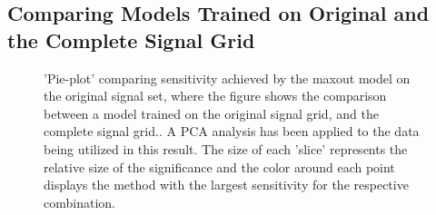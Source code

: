 \subsection{Comparing Models Trained on Original and the Complete Signal Grid}\label{appendix:BigVsSmall}
\begin{figure}[H]
    \caption['Pie-plot' comparing sensitivity achieved by the maxout model on the original signal set, where the figure shows the comparison between a model trained 
    on the original signal grid, and the complete signal grid.]{'Pie-plot' comparing sensitivity achieved by the maxout model on the original signal set, where the figure 
    shows the comparison between a model trained on the original signal grid, and the complete signal grid.. A \ac{PCA} analysis has been applied to the data being utilized 
    in this result. The size of each 'slice' represents the relative size of the significance and the color around each 
    point displays the method with the largest sensitivity for the respective combination.}
    \label{fig:BigVsLittleSetMaxOut}
\end{figure}
